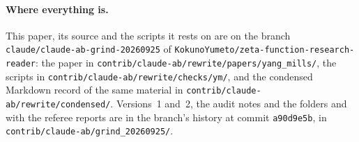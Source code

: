 \paragraph{Where everything is.}
This paper, its source and the scripts it rests on are on the branch \texttt{claude/claude-ab-grind-20260925} of \texttt{KokunoYumeto/zeta-function-research-reader}: the paper in \texttt{contrib/claude-ab/rewrite/papers/yang\_mills/}, the scripts in \texttt{contrib/claude-ab/rewrite/checks/ym/}, and the condensed Markdown record of the same material in \texttt{contrib/claude-ab/rewrite/condensed/}. Versions~1 and~2, the audit notes and the folders  and  with the referee reports are in the branch's history at commit \texttt{a90d9e5b}, in \texttt{contrib/claude-ab/grind\_20260925/}.

